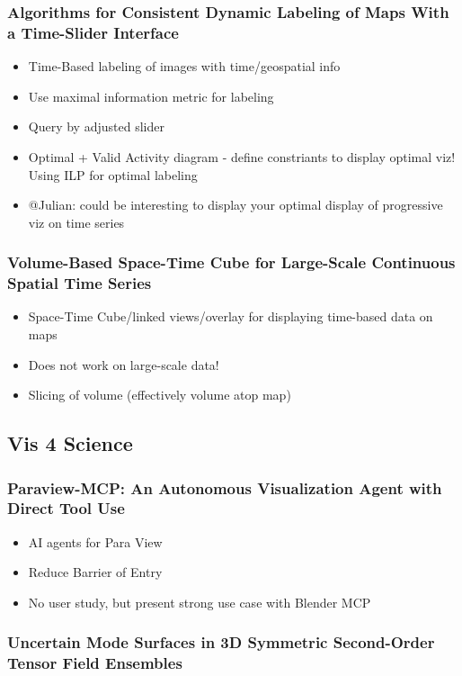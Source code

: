 \documentclass[a4paper]{article}
\begin{document}
\subsubsection{Algorithms for Consistent Dynamic Labeling of Maps With a Time-Slider Interface}
\begin{itemize}
    \item Time-Based labeling of images with time/geospatial info
    \item Use maximal information metric for labeling
    \item Query by adjusted slider
    \item Optimal + Valid Activity diagram - define constriants to display optimal viz! Using ILP for optimal labeling
    \item @Julian: could be interesting to display your optimal display of progressive viz on time series
\end{itemize}
\subsubsection{Volume-Based Space-Time Cube for Large-Scale Continuous Spatial Time Series}
\begin{itemize}
    \item Space-Time Cube/linked views/overlay for displaying time-based data on maps
    \item Does not work on large-scale data!
    \item Slicing of volume (effectively volume atop map)
\end{itemize}
\subsection{Vis 4 Science}
\subsubsection{Paraview-MCP: An Autonomous Visualization Agent with Direct Tool Use}

\begin{itemize}
    \item AI agents for Para View
    \item Reduce Barrier of Entry
    \item No user study, but present strong use case with Blender MCP
\end{itemize}

\subsubsection{Uncertain Mode Surfaces in 3D Symmetric Second-Order Tensor Field Ensembles}
\end{document}
